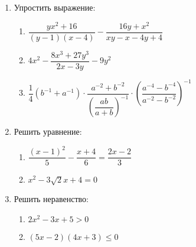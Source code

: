 \documentclass[12pt, a5paper]{article}
\begin{document}
	
\begin{enumerate}
	\item Упростить выражение:
	\begin{enumerate}[label=\asbuk*)]
		\item $\dfrac{yx^2+16}{(y-1)(x-4)}-\dfrac{16y+x^2}{xy-x-4y+4}$
		\item $4x^2-\dfrac{8x^3+27y^3}{2x-3y}-9y^2$
		\item $\dfrac{1}{4}(b^{-1}+a^{-1})\cdot\dfrac{a^{-2}+b^{-2}}{\left(\dfrac{ab}{a+b}\right)^{-1}}\cdot\left(\dfrac{a^{-4}-b^{-4}}{a^{-2}-b^{-2}}\right)^{-1}$
	\end{enumerate}
	\item Решить уравнение:
	\begin{enumerate}[label=\asbuk*)]
		\item $\dfrac{(x-1)^2}{5}-\dfrac{x+4}{6}=\dfrac{2x-2}{3}$
		\item $x^2-3\sqrt{2}x+4=0$
	\end{enumerate}
	\item Решить неравенство:
	\begin{enumerate}[label=\asbuk*)]
		\item $2x^2-3x+5>0$
		\item $(5x-2)(4x+3)\leq0$
	\end{enumerate}
\end{enumerate}
\end{document}
